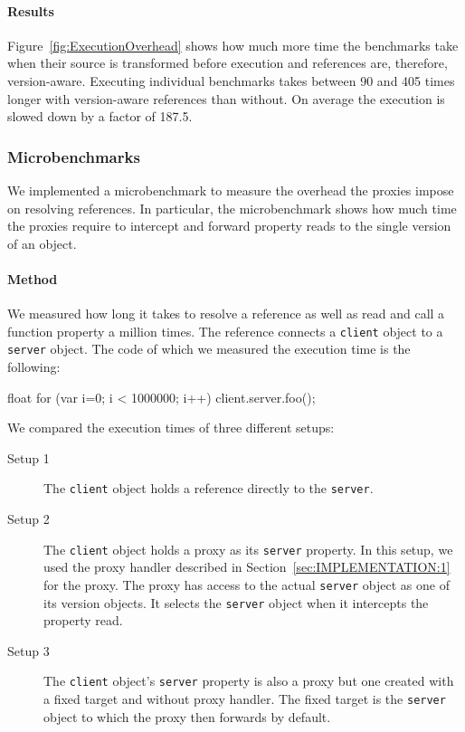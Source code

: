\paragraph{Results}
Figure~\ref{fig:ExecutionOverhead} shows how much more time the benchmarks take when their source is transformed before execution and references are, therefore, version-aware.
Executing individual benchmarks takes between 90 and 405 times longer with version-aware references than without.
On average the execution is slowed down by a factor of 187.5.


\subsubsection{Microbenchmarks}

We implemented a microbenchmark to measure the overhead the proxies impose on resolving references.
In particular, the microbenchmark shows how much time the proxies require to intercept and forward property reads to the single version of an object.

\paragraph{Method}
We measured how long it takes to resolve a reference as well as read and call a function property a million times.
The reference connects a \lstinline{client} object to a \lstinline{server} object.
The code of which we measured the execution time is the following:

\begin{code}{}{float}
for (var i=0; i < 1000000; i++) {
    client.server.foo();
} 
\end{code}
\iffalse
\end{verbatim}\fi

We compared the execution times of three different setups:

\begin{description}
    \item[Setup 1] The \lstinline{client} object holds a reference directly to the \lstinline{server}.
    \item[Setup 2] The \lstinline{client} object holds a proxy as its \lstinline{server} property. In this setup, we used the proxy handler described in Section~\ref{sec:IMPLEMENTATION:1} for the proxy. The proxy has access to the actual \lstinline{server} object as one of its version objects. It selects the \lstinline{server} object when it intercepts the property read.
    \item[Setup 3] The \lstinline{client} object's \lstinline{server} property is also a proxy but one created with a fixed target and without proxy handler. The fixed target is the \lstinline{server} object to which the proxy then forwards by default.
\end{description}

